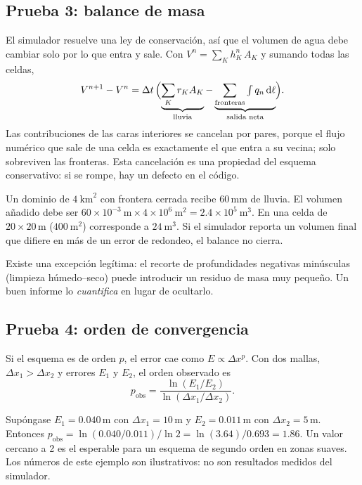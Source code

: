 \documentclass[11pt,a4paper]{article}
\newcommand{\dd}{\mathrm d}
\begin{document}
\subsection{Prueba 3: balance de masa}

El simulador resuelve una ley de conservación, así que el volumen de agua debe cambiar solo por lo que entra
y sale. Con $V^n=\sum_K h_K^n\,A_K$ y sumando todas las celdas,
\begin{equation}
  V^{n+1}-V^{n}=\Delta t\,\Bigl(\underbrace{\sum_K r_K A_K}_{\text{lluvia}}
  -\underbrace{\sum_{\text{fronteras}}\textstyle\int q_n\,\dd\ell}_{\text{salida neta}}\Bigr).
  \label{eq:balance}
\end{equation}
Las contribuciones de las caras interiores se cancelan por pares, porque el flujo numérico que sale de una
celda es exactamente el que entra a su vecina; solo sobreviven las fronteras. Esta cancelación es una
propiedad del esquema conservativo: si se rompe, hay un defecto en el código.

\begin{ejemplo}
Un dominio de $4\ \mathrm{km}^2$ con frontera cerrada recibe $60$\,mm de lluvia. El volumen añadido debe ser
$60\times10^{-3}\ \mathrm{m}\times4\times10^{6}\ \mathrm{m}^2=2.4\times10^{5}\ \mathrm{m}^3$. En una celda de
$20\times20$\,m ($400\ \mathrm{m}^2$) corresponde a $24\ \mathrm{m}^3$. Si el simulador reporta un volumen
final que difiere en más de un error de redondeo, el balance no cierra.
\end{ejemplo}

Existe una excepción legítima: el recorte de profundidades negativas minúsculas (limpieza húmedo--seco) puede
introducir un residuo de masa muy pequeño. Un buen informe lo \emph{cuantifica} en lugar de ocultarlo.

\subsection{Prueba 4: orden de convergencia}

Si el esquema es de orden $p$, el error cae como $E\propto\Delta x^{p}$. Con dos mallas, $\Delta x_1>\Delta x_2$ y
errores $E_1$ y $E_2$, el orden observado es
\begin{equation}
  p_{\text{obs}}=\frac{\ln(E_1/E_2)}{\ln(\Delta x_1/\Delta x_2)} .
  \label{eq:orden}
\end{equation}

\begin{ejemplo}
Supóngase $E_1=0.040$\,m con $\Delta x_1=10$\,m y $E_2=0.011$\,m con $\Delta x_2=5$\,m. Entonces
$p_{\text{obs}}=\ln(0.040/0.011)/\ln2=\ln(3.64)/0.693=1.86$.
Un valor cercano a 2 es el esperable para un esquema de segundo orden en zonas suaves. Los números de este
ejemplo son ilustrativos: no son resultados medidos del simulador.
\end{ejemplo}
\end{document}
